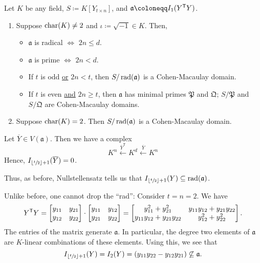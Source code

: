\documentclass[12pt]{article}
\begin{document}
\begin{thm}
	Let $K$ be any field, $S \coloneqq K[Y_{t \times n}]$, and $\mathfrak{a} \coloneqq I_{1}(Y^{\trans} Y)$.
	\begin{enumerate}[label=(\alph*)]
		\item Suppose $\operatorname{char}(K) \neq 2$ and $\iota \coloneqq \sqrt{-1} \in K$. Then,
		\begin{itemize}
			\item $\mathfrak{a}$ is radical $\Leftrightarrow$ $2n \le d$.
			\item $\mathfrak{a}$ is prime $\Leftrightarrow$ $2n < d$.
			\item If $t$ is odd \underline{or} $2n < t$, then $S/\operatorname{rad}(\mathfrak{a})$ is a Cohen-Macaulay domain.
			\item If $t$ is even \underline{and} $2n \ge t$, then $\mathfrak{a}$ has minimal primes $\mathfrak{P}$ and $\mathfrak{Q}$; $S/\mathfrak{P}$ and $S/\mathfrak{Q}$ are Cohen-Macaulay domains.
		\end{itemize}
		\item Suppose $\operatorname{char}(K) = 2$. Then $S/\operatorname{rad}(\mathfrak{a})$ is a Cohen-Macaulay domain.
	\end{enumerate}
\end{thm}

\begin{rem}
	Let $\overline{Y} \in V(\mathfrak{a})$. Then we have a complex
	\begin{equation*} 
		\text{$K^{n} \xleftarrow{\overline{Y}^{\mathsf{T}}} K^{d}$} \xleftarrow{\overline{Y}} K^{n}
	\end{equation*}
	Hence, $I_{\left\lfloor \sfrac{t}{2} \right\rfloor + 1}(\overline{Y}) = 0$. 

	Thus, as before, Nullstellensatz tells us that $I_{\left\lfloor \sfrac{t}{2} \right\rfloor + 1}(Y) \subseteq \operatorname{rad}(\mathfrak{a})$.
\end{rem}

Unlike before, one cannot drop the ``rad'': Consider $t = n = 2$. We have
\begin{equation*} 
	Y^{\mathsf{T}}Y = \begin{bmatrix} y_{11} & y_{21} \\ y_{12} & y_{22} \end{bmatrix} \cdot \begin{bmatrix} y_{11} & y_{12} \\ y_{21} & y_{22} \end{bmatrix} = \begin{bmatrix} y_{11}^{2} + y_{21}^{2} & y_{11} y_{12} + y_{21} y_{22} \\ y_{11} y_{12} + y_{21} y_{22} & y_{12}^{2} + y_{22}^{2} \end{bmatrix}.
\end{equation*}
The entries of the matrix generate $\mathfrak{a}$. In particular, the degree two elements of $\mathfrak{a}$ are $K$-linear combinations of these elements. Using this, we see that
\begin{equation*} 
	I_{\left\lfloor \sfrac{t}{2} \right\rfloor + 1}(Y) = I_{2}(Y) = (y_{11}y_{22} - y_{12}y_{21}) \not\subseteq \mathfrak{a}.
\end{equation*}
\end{document}
